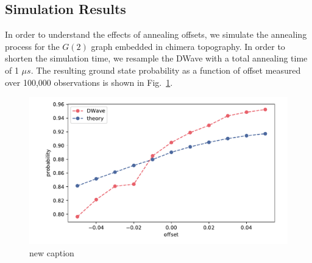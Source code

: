 \documentclass[prd,twocolumn,tightenlines,preprintnumbers,showpacs,superscriptaddress,notitlepage,nofootinbib,eqsecnum,
floatfix,longbibliography,aps,10pt]{revtex4-2}
\begin{document}
\subsection{Simulation Results}

In order to understand the effects of annealing offsets, we simulate the annealing process for the $G(2)$ graph embedded in chimera topography. In order to shorten the simulation time, we resample the DWave with a total annealing time of 1 $\mu s$. The resulting ground state probability as a function of offset measured over 100,000 observations is shown in Fig.~\ref{fig:dwave1us}.

\begin{figure}
	\centering
	\includegraphics[width=\columnwidth]{./new_figures/NN2_offset_scaling.pdf}
	\caption{ {\color{red} new caption}}
	\label{fig:dwave1us}
\end{figure}
\end{document}

